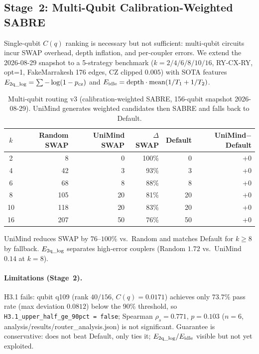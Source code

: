 ﻿\documentclass[12pt,a4paper]{article}
\begin{document}
\subsection{Stage~2: Multi-Qubit Calibration-Weighted SABRE}\label{sec:routing_mq}

Single-qubit $C(q)$ ranking is necessary but not
sufficient: multi-qubit circuits incur SWAP overhead,
depth inflation, and per-coupler errors. We extend
the 2026-08-29 snapshot to a 5-strategy benchmark
($k=2/4/6/8/10/16$, RY-CX-RY, opt=1, FakeMarrakesh
176 edges, CZ clipped $0.005$) with SOTA features
$E_{\rm 2q\_log}=\sum -\log(1-p_{\rm cz})$
and $E_{\rm idle}={\rm depth}\cdot{\rm mean}(1/T_1+1/T_2)$.

\begin{table}[H]
\centering
\caption{Multi-qubit routing v3 (calibration-weighted SABRE,
156-qubit snapshot 2026-08-29). UniMind generates
weighted candidates then SABRE and falls back to Default.}
\label{tab:routing_mq}
\small
\begin{tabular}{@{}crrrrr@{}}
\hline
$k$ & Random SWAP & UniMind SWAP & $\Delta$SWAP & Default & UniMind$-$Default \\
\hline
2 & 8 & 0 & 100\% & 0 & +0 \\
4 & 42 & 3 & 93\% & 3 & +0 \\
6 & 68 & 8 & 88\% & 8 & +0 \\
8 & 105 & 20 & 81\% & 20 & +0 \\
10 & 118 & 20 & 83\% & 20 & +0 \\
16 & 207 & 50 & 76\% & 50 & +0 \\
\hline
\end{tabular}
\end{table}

UniMind reduces SWAP by $76$--$100\%$ vs.\ Random
and matches Default for $k\ge 8$ by fallback.
$E_{\rm 2q\_log}$ separates high-error couplers
(Random $1.72$ vs.\ UniMind $0.14$ at $k=8$).

\paragraph{Limitations (Stage~2).} H3.1 fails: qubit q109 (rank $40/156$, $C(q)=0.0171$) achieves only $73.7\%$ pass rate (max deviation $0.0812$) below the $90\%$ threshold, so \texttt{H3.1\_upper\_half\_ge\_90pct = false}; Spearman $\rho_s=0.771$, $p=0.103$ ($n{=}6$, analysis/results/router\_analysis.json) is not significant. Guarantee is conservative:
does not beat Default, only ties it; $E_{\rm 2q\_log}/E_{\rm idle}$
visible but not yet exploited.
\end{document}
